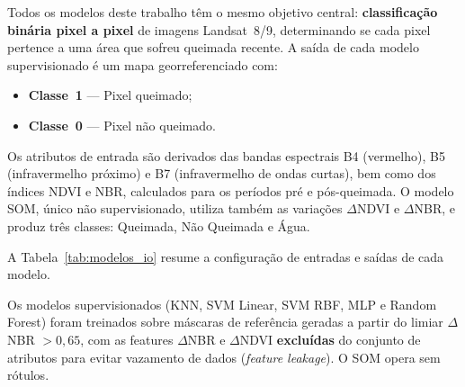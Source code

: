 \documentclass[conference]{IEEEtran}
\begin{document}
Todos os modelos deste trabalho têm o mesmo objetivo central: \textbf{classificação
binária pixel a pixel} de imagens Landsat~8/9, determinando se cada pixel pertence
a uma área que sofreu queimada recente. A saída de cada modelo supervisionado é
um mapa georreferenciado com:
\begin{itemize}
  \item \textbf{Classe~1} — Pixel queimado;
  \item \textbf{Classe~0} — Pixel não queimado.
\end{itemize}

Os atributos de entrada são derivados das bandas espectrais B4 (vermelho),
B5 (infravermelho próximo) e B7 (infravermelho de ondas curtas), bem como dos
índices NDVI e NBR, calculados para os períodos pré e pós-queimada. O modelo
SOM, único não supervisionado, utiliza também as variações $\Delta$NDVI e
$\Delta$NBR, e produz três classes: Queimada, Não Queimada e Água.

A Tabela~\ref{tab:modelos_io} resume a configuração de entradas e saídas de
cada modelo.

\begin{table}[!t]
  \caption{Entradas e saídas por modelo}
  \label{tab:modelos_io}
  \centering
\end{table}

Os modelos supervisionados (KNN, SVM Linear, SVM RBF, MLP e Random Forest)
foram treinados sobre máscaras de referência geradas a partir do limiar
$\Delta$NBR $> 0{,}65$, com as features $\Delta$NBR e $\Delta$NDVI
\textbf{excluídas} do conjunto de atributos para evitar vazamento de dados
(\textit{feature leakage}). O SOM opera sem rótulos.
\end{document}
